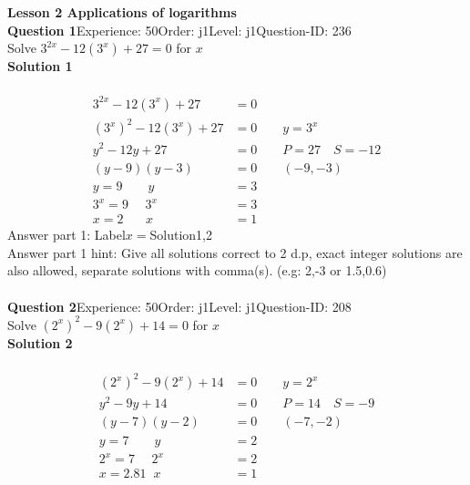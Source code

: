 \documentclass{article}
\begin{document}
\noindent\huge{\textbf{Lesson 2 Applications of logarithms}}\\[12pt]
\noindent\textbf{Question 1}\hspace{20pt}Experience: 50\hspace{20pt}Order: j1\hspace{20pt}Level: j1\hspace{20pt}Question-ID: 236\\[2pt]
Solve $3^{2x}-12(3^x)+27=0$ for $x$\\[4pt]
\noindent\textbf{Solution 1}\\[2pt]
\\[-35pt]\begin{align*}
3^{2x}-12(3^x)+27&=0\\[2pt]
(3^x)^2-12(3^x)+27&=0\qquad y=3^x\\[2pt]
y^2-12y+27&=0\qquad P=27 \quad S=-12\\[2pt]
(y-9)(y-3)&=0\qquad (-9,-3)\\[2pt]
y=9 \qquad y&=3\\[2pt]
3^x=9\hspace{16pt} 3^x&=3\\[2pt]
x=2 \hspace{21pt} x&=1
\end{align*}
Answer part 1: \hspace{10pt}Label\hspace{10pt}$x=$\hspace{10pt}Solution\hspace{10pt}1,2\\
Answer part 1 hint: \hspace{15pt}Give all solutions correct to 2 d.p, exact integer solutions are also allowed, separate solutions with comma(s).  (e.g:  2,-3 or 1.5,0.6)  \\
\\[4pt]
\noindent\textbf{Question 2}\hspace{20pt}Experience: 50\hspace{20pt}Order: j1\hspace{20pt}Level: j1\hspace{20pt}Question-ID: 208\\[2pt]
Solve $(2^x)^2-9(2^x)+14=0$ for $x$\\[4pt]
\noindent\textbf{Solution 2}\\[2pt]
\\[-35pt]\begin{align*}
(2^x)^2-9(2^x)+14&=0\qquad y=2^x\\[2pt]
y^2-9y+14&=0\qquad P=14 \quad S=-9\\[2pt]
(y-7)(y-2)&=0\qquad (-7,-2)\\[2pt]
y=7 \qquad y&=2\\[2pt]
2^x=7\hspace{16pt} 2^x&=2\\[2pt]
x=2.81 \hspace{7pt} x&=1
\end{align*}
\end{document}
